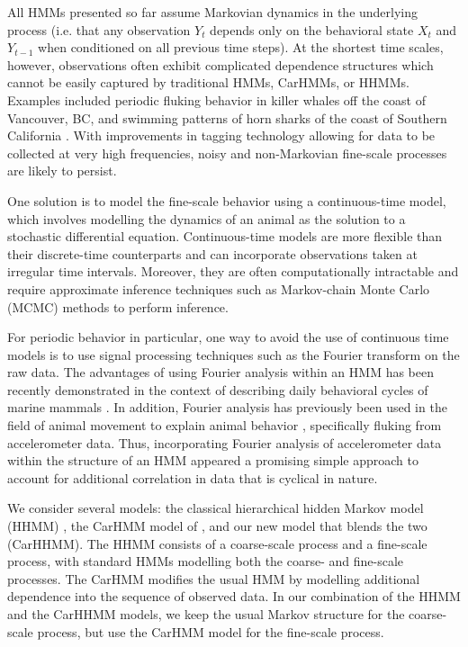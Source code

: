 All HMMs presented so far assume Markovian dynamics in the underlying process (i.e. that any observation $Y_t$ depends only on the behavioral state $X_t$ and $Y_{t-1}$ when conditioned on all previous time steps). At the shortest time scales, however, observations often exhibit complicated dependence structures which cannot be easily captured by traditional HMMs, CarHMMs, or HHMMs. Examples included periodic fluking behavior in killer whales off the coast of Vancouver, BC, and swimming patterns of horn sharks of the coast of Southern California \citep{Adam:2019}.  With improvements in tagging technology allowing for data to be collected at very high frequencies, noisy and non-Markovian fine-scale processes are likely to persist.

One solution is to model the fine-scale behavior using a continuous-time model, which involves modelling the dynamics of an animal as the solution to a stochastic differential equation. Continuous-time models are more flexible than their discrete-time counterparts and can incorporate observations taken at irregular time intervals. Moreover, they are often computationally intractable and require approximate inference techniques such as Markov-chain Monte Carlo (MCMC) methods to perform inference.

For periodic behavior in particular, one way to avoid the use of continuous time models is to use signal processing techniques such as the Fourier transform on the raw data. The advantages of using Fourier analysis within an HMM has been recently demonstrated in the context of describing daily behavioral cycles of marine mammals \citep{Heerah:2017}. In addition, Fourier analysis has previously been used in the field of animal movement to explain animal behavior \citep{Fehlmann:2017}, specifically fluking \citep{Shorter:2017} from accelerometer data. Thus, incorporating Fourier analysis of accelerometer data within the structure of an HMM appeared a promising simple approach to account for additional correlation in data that is cyclical in nature.

We consider several models: the classical hierarchical hidden Markov model (HHMM) \citep{Barajas:2017}, the CarHMM model of \citep{Lawler:2019}, and our new model that blends the two (CarHHMM). The HHMM consists of a coarse-scale process and a fine-scale process, with standard HMMs modelling both the coarse- and fine-scale processes. The CarHMM modifies the usual HMM by modelling additional dependence into the sequence of observed data. In our combination of the HHMM and the CarHHMM models, we keep the usual Markov structure for the coarse-scale process, but use the CarHMM model for the fine-scale process.

